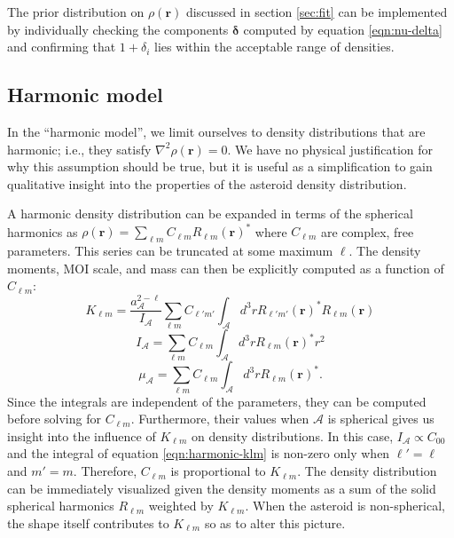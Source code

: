 \documentclass[fleqn,usenatbib]{mnras}
\begin{document}
The prior distribution on $\rho(\bm r)$ discussed in section \ref{sec:fit} can be implemented by individually checking the components $\bm \delta$ computed by equation \ref{eqn:nu-delta} and confirming that $1 + \delta_i$ lies within the acceptable range of densities.


\subsection{Harmonic model}
In the ``harmonic model'', we limit ourselves to density distributions that are harmonic; i.e., they satisfy $\nabla^2 \rho(\bm r) = 0$. We have no physical justification for why this assumption should be true, but it is useful as a simplification to gain qualitative insight into the properties of the asteroid density distribution.

A harmonic density distribution can be expanded in terms of the spherical harmonics as $\rho(\bm r) = \sum_{\ell m} C_{\ell m} R_{\ell m}(\bm r)^*$ where $C_{\ell m}$ are complex, free parameters. This series can be truncated at some maximum $\ell$. The density moments, MOI scale, and mass can then be explicitly computed as a function of $C_{\ell m}$:
\begin{equation}
  K_{\ell m} = \frac{a_\mathcal{A}^{2-\ell}}{I_\mathcal{A}} \sum_{\ell m} C_{\ell' m'} \int_\mathcal{A} d^3 r R_{\ell' m'}(\bm r)^* R_{\ell m}(\bm r)
  \label{eqn:harmonic-klm}
\end{equation}
\begin{equation}
  I_\mathcal{A} = \sum_{\ell m} C_{\ell m} \int_\mathcal{A} d^3 r R_{\ell m}(\bm r)^* r^2
  \label{eqn:harmonic-ia}
\end{equation}
\begin{equation}
  \mu_\mathcal{A} = \sum_{\ell m} C_{\ell m} \int_\mathcal{A} d^3 r R_{\ell m}(\bm r)^*.
  \label{eqn:harmonic-mass}
\end{equation}
Since the integrals are independent of the parameters, they can be computed before solving for $C_{\ell m}$. Furthermore, their values when $\mathcal{A}$ is spherical gives us insight into the influence of $K_{\ell m}$ on density distributions. In this case, $I_\mathcal{A} \propto C_{00}$ and the integral of equation \ref{eqn:harmonic-klm} is non-zero only when $\ell' = \ell$ and $m'=m$. Therefore, $C_{\ell m}$ is proportional to $K_{\ell m}$. The density distribution can be immediately visualized given the density moments as a sum of the solid spherical harmonics $R_{\ell m}$ weighted by $K_{\ell m}$. When the asteroid is non-spherical, the shape itself contributes to $K_{\ell m}$ so as to alter this picture.
\end{document}
